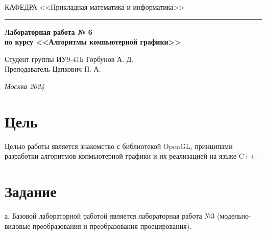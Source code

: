 \documentclass[a4paper, 14pt]{extarticle}
\begin{document}
\begin{titlepage}
\vspace{0.5ex}
\hspace{-35pt} \noindent \small КАФЕДРА\hspace{50pt} <<Прикладная математика и информатика>>

\vspace*{-16pt}
\hspace{30pt}\rule{0.866\textwidth}{0.4pt}
  
\vspace{11em}

\begin{center}
\Large {\bf Лабораторная работа № 6} \\ 
\large {\bf по курсу <<Алгоритмы компьютерной графики>>}\\
\end{center}\normalsize

\vspace{8em}


\begin{flushright}
  {Студент группы ИУ9-41Б Горбунов А. Д.\hspace*{15pt} \\
  \vspace{2ex}
  Преподаватель Цапкович П. А.\hspace*{15pt}}
\end{flushright}

\bigskip

\vfill
 

\begin{center}
\textsl{Москва 2024}
\end{center}
\end{titlepage}

\renewcommand{\ttdefault}{pcr}

\setlength{\tabcolsep}{3pt}
\newpage
\setcounter{page}{2}

\section{Цель}\label{Sect::task}
\par
Целью работы является знакомство с библиотекой OpenGL, принципами разработки алгоритмов копмьютерной графики и их реализацией на языке C++.
\section{Задание}\label{Sect::task}
\par
а. Базовой лабораторной работой является лабораторная работа №3 (модельно-видовые
преобразования и преобразования проецирования).
\end{document}
